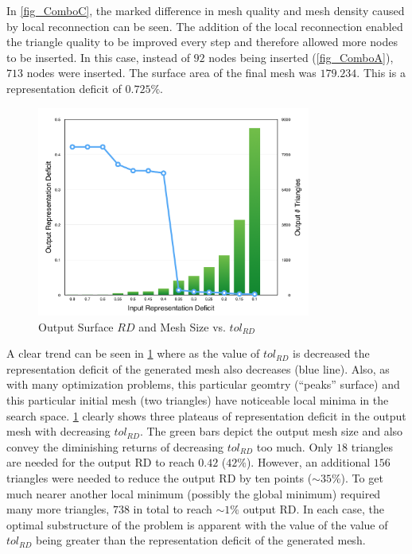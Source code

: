 In \ref{fig_ComboC}, the marked difference in mesh quality and mesh
density caused by local reconnection can be seen.  The addition of the
local reconnection enabled the triangle quality to be improved every
step and therefore allowed more nodes to be inserted. In this case, 
instead of $92$ nodes being inserted (\ref{fig_ComboA}), $713$ nodes were
inserted. The surface area of the final mesh was $179.234$. This is a
representation deficit of $0.725\%$.

\begin{figure}[h!]
  \begin{center}
  \includegraphics[width=90mm]{Figures/RDvsMeshSize.png}
  \caption{Output Surface $RD$ and Mesh Size vs. $tol_{RD}$}
  \label{fig_RDvsMeshSize}
  \end{center}
\end{figure}

A clear trend can be seen in \ref{fig_RDvsMeshSize} where as the value
of $tol_{RD}$ is decreased the representation deficit of the generated
mesh also decreases (blue line). Also, as with many optimization
problems, this particular geomtry (``peaks'' surface) and this
particular initial mesh (two triangles) have noticeable local minima in
the search space. \ref{fig_RDvsMeshSize} clearly shows three plateaus of
representation deficit in the output mesh with decreasing $tol_{RD}$.
The green bars depict the output mesh size and also convey the
diminishing returns of decreasing $tol_{RD}$ too much. Only $18$
triangles are needed for the output RD to reach $0.42$ ($42\%$).
However, an additional $156$ triangles were needed to reduce the output
RD by ten points ($\sim 35\%$). To get much nearer another local
minimum (possibly the global minimum) required many more triangles,
$738$ in total to reach $\sim 1\%$ output RD. In each case, the
optimal substructure of the problem is apparent with the value of the
value of $tol_{RD}$ being greater than the representation deficit of
the generated mesh.

